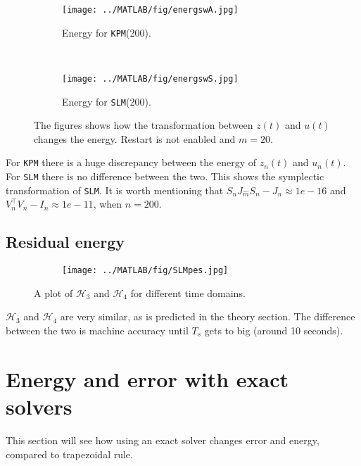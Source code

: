 \begin{figure}[H]
        \centering
        \begin{subfigure}[b]{0.3\textwidth}
                \texttt{[image: ../MATLAB/fig/energswA.jpg]}
                \caption{ Energy for \texttt{KPM}(200). }
                \label{fig:energyswA}
        \end{subfigure}
        ~
		\begin{subfigure}[b]{0.3\textwidth}
                \texttt{[image: ../MATLAB/fig/energswS.jpg]}
                \caption{ Energy for \texttt{SLM}(200). }
                \label{fig:energswS}
        \end{subfigure}        
        \caption{ The figures shows how the transformation between $z(t)$ and $u(t)$ changes the energy. Restart is not enabled and $m = 20$. }
        \label{fig:energs}
\end{figure}
\noindent For \texttt{KPM} there is a huge discrepancy between the energy of $z_{n}(t)$ and $u_{n}(t)$. For \texttt{SLM} there is no difference between the two. This shows the symplectic transformation of \texttt{SLM}. It is worth mentioning that $S_n J_{\hat{m}}S_n - J_n \approx 1e-16$ and $V_n^\top V_n - I_n \approx 1e-11$, when $n = 200$.
\subsection{Residual energy}%
\label{sec:residualenergy}
\begin{figure}[H]
        \centering
        \begin{subfigure}[b]{0.45\textwidth}
                \texttt{[image: ../MATLAB/fig/SLMpes.jpg]}
        \end{subfigure}
		
        \caption{ A plot of $\mathcal{H}_3$ and $\mathcal{H}_4$ for different time domains. }
        \label{fig:SLMpes}
\end{figure}
$\mathcal{H}_3$ and $\mathcal{H}_4$ are very similar, as is predicted in the theory section. The difference between the two is machine accuracy until $T_s$ gets to big (around 10 seconds). \\
\section{Energy and error with exact solvers} %
\label{sec:diag}
This section will see how using an exact solver changes error and energy, compared to trapezoidal rule.\\

